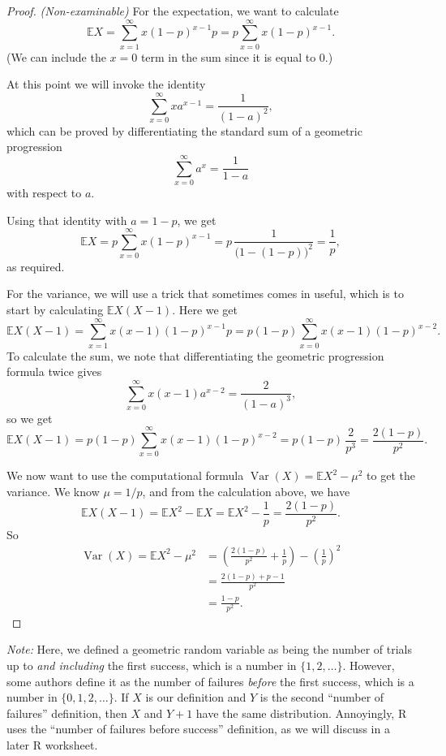 \documentclass[
  a4paper,
]{book}
\theoremstyle{definition}
\theoremstyle{definition}
\theoremstyle{definition}
\theoremstyle{definition}
\theoremstyle{remark}
\begin{document}
\begin{proof}
\emph{(Non-examinable)}
For the expectation, we want to calculate
\[ \mathbb EX = \sum_{x=1}^\infty x (1-p)^{x-1} p = p \sum_{x=0}^\infty x (1-p)^{x-1}. \]
(We can include the \(x = 0\) term in the sum since it is equal to 0.)

At this point we will invoke the identity
\[ \sum_{x = 0}^\infty x a^{x-1} = \frac{1}{(1-a)^2} , \]
which can be proved by differentiating the standard sum of a geometric progression
\[ \sum_{x = 0}^\infty a^x = \frac{1}{1 - a} \]
with respect to \(a\).

Using that identity with \(a = 1-p\), we get
\[ \mathbb EX = p \sum_{x=0}^\infty x (1-p)^{x-1} = p\, \frac{1}{\big(1 - (1-p)\big)^2} = \frac{1}{p} , \]
as required.

For the variance, we will use a trick that sometimes comes in useful, which is to start by calculating \(\mathbb EX(X-1)\). Here we get
\[ \mathbb EX(X-1) = \sum_{x=1}^\infty x (x-1) (1-p)^{x-1} p = p(1-p) \sum_{x=0}^\infty x(x-1) (1-p)^{x-2} . \]
To calculate the sum, we note that differentiating the geometric progression formula twice gives
\[ \sum_{x = 0}^\infty x(x-1) a^{x-2} = \frac{2}{(1-a)^3} , \]
so we get
\[ \mathbb EX(X-1) = p(1-p) \sum_{x=0}^\infty x(x-1) (1-p)^{x-2} = p(1 -p) \, \frac{2}{p^3} = \frac{2(1-p)}{p^2} . \]

We now want to use the computational formula \(\operatorname{Var}(X) = \mathbb EX^2 - \mu^2\) to get the variance. We know \(\mu = 1/p\), and from the calculation above, we have
\[ \mathbb EX(X-1) = \mathbb EX^2 - \mathbb EX = \mathbb EX^2 - \frac{1}{p} = \frac{2(1-p)}{p^2} . \]
So
\begin{align*}
\operatorname{Var}(X) = \mathbb EX^2 - \mu^2
&= \left(\frac{2(1-p)}{p^2} + \frac{1}{p}\right) - \left(\frac{1}{p}\right)^2 \\
&= \frac{2(1-p) + p - 1}{p^2} \\
&= \frac{1-p}{p^2} .
\end{align*}
\end{proof}

\emph{Note:} Here, we defined a geometric random variable as being the number of trials up to \emph{and including} the first success, which is a number in \(\{1, 2, \dots\}\). However, some authors define it as the number of failures \emph{before} the first success, which is a number in \(\{0, 1, 2,\dots\}\). If \(X\) is our definition and \(Y\) is the second ``number of failures'' definition, then \(X\) and \(Y+1\) have the same distribution. Annoyingly, R uses the ``number of failures before success'' definition, as we will discuss in a later R worksheet.
\end{document}
